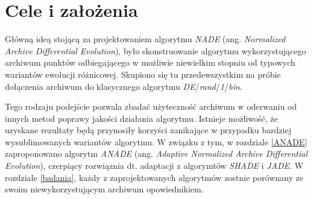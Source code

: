 \documentclass[12pt,a4paper]{report}
\begin{document}
{{{{\section{Cele i założenia}
\par{
Główną ideą stojącą za projektowaniem algorytmu \emph{NADE} (ang. \emph{Normalized Archive Differential Evolution}), było skonstruowanie algorytmu wykorzystującego archiwum punktów odbiegającego w możliwie niewielkim stopniu od typowych wariantów ewolucji różnicowej. Skupiono się tu przedewszystkim na próbie dołączenia archiwum do klasycznego algorytmu \emph{DE}/\emph{rand}/\emph{1}/\emph{bin}.
}
\par{
Tego rodzaju podejście pozwala zbadać użyteczność archiwum w oderwaniu od innych metod poprawy jakości działania algorytmu. Istnieje możliwość, że uzyskane rezultaty będą przynosiły korzyści zanikające w przypadku bardziej wysublimowanych wariantów algorytmu. W związku z tym, w rozdziale \ref{ANADE} zaproponowano algorytm \emph{ANADE} (ang. \emph{Adaptive Normalized Archive Differential Evolution}), czerpiący rozwiąznia dt. adaptacji z algorymtów \emph{SHADE} i \emph{JADE}. W rozdziale \ref{badania}, każdy z zaprojektowanych algorytmów zostnie porównany ze swoim niewykorzystującym archiwum opowiednikiem.
}
}}}}
\end{document}
